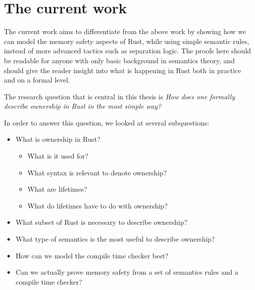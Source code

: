 \section{The current work}
The current work aims to differentiate from the above work by showing how we can model the memory safety aspects of Rust, while using simple semantic rules, instead of more advanced tactics such as separation logic. The proofs here should be readable for anyone with only basic background in semantics theory, and should give the reader insight into what is happening in Rust both in practice and on a formal level. 

The research question that is central in this thesis is \emph{How does one formally describe ownership in Rust in the most simple way?}

In order to answer this question, we looked at several subquestions:

\begin{itemize}[noitemsep]
    \item What is ownership in Rust?
    \begin{itemize}[noitemsep]
        \item What is it used for?
        \item What syntax is relevant to denote ownership?
        \item What are lifetimes?
        \item What do lifetimes have to do with ownership?
    \end{itemize}
    \item What subset of Rust is necessary to describe ownership?
    \item What type of semantics is the most useful to describe ownership?
    \item How can we model the compile time checker best?
    \item Can we actually prove memory safety from a set of semantics rules and a compile time checker?
\end{itemize}



